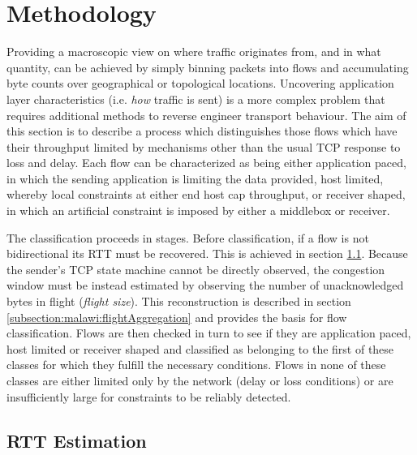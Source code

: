 \section{Methodology}
\label{section:malawi:methodology}

Providing a macroscopic view on where traffic originates from, and in what quantity, can be achieved by simply binning packets into flows and accumulating byte counts over geographical or topological locations. 
Uncovering application layer characteristics (i.e. \textit{how} traffic is sent) is a more complex problem that requires additional methods to reverse engineer transport behaviour.
The aim of this section is to describe a process which distinguishes those flows which have their throughput limited by mechanisms other than the usual \ac{TCP} response to loss and delay.
Each flow can be characterized as being either application paced, in which the sending application is limiting the data provided, host limited, whereby local constraints at either end host cap throughput, or receiver shaped, in which an artificial constraint is imposed by either a middlebox or receiver.

The classification proceeds in stages. 
Before classification, if a flow is not bidirectional its RTT must be recovered.
This is achieved in section \ref{subsection:malawi:PeriodicEnhancement}. 
Because the sender's TCP state machine cannot be directly observed, the congestion window must be instead estimated by observing the number of unacknowledged bytes in flight (\textit{flight size}).
This reconstruction is described in section \ref{subsection:malawi:flightAggregation} and provides the basis for flow classification. 
Flows are then checked in turn to see if they are application paced, host limited or receiver shaped and classified as belonging to the first of these classes for which they fulfill the necessary conditions.
Flows in none of these classes are either limited only by the network (delay or loss conditions) or are insufficiently large for constraints to be reliably detected.

\subsection{\acs{RTT} Estimation}
\label{subsection:malawi:PeriodicEnhancement}

